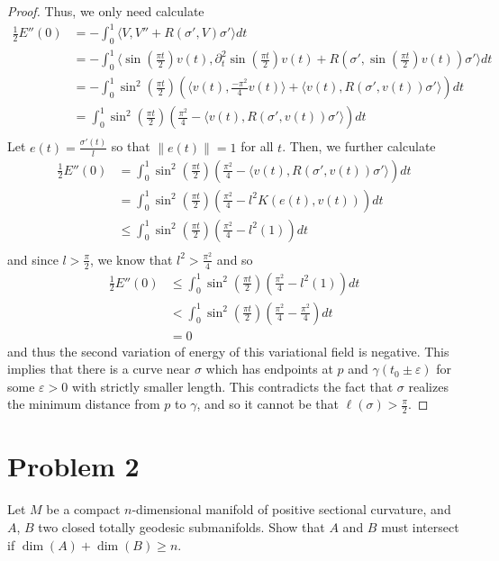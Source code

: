 \documentclass[fontsize=11pt]{scrartcl} %
\numberwithin{equation}{section} %
\numberwithin{figure}{section} %
\numberwithin{table}{section} %
\begin{document}
\begin{proof}
    Thus, we only need calculate
    \[
\begin{aligned}
    \frac{1}{2}E''(0) &= -\int_0^1\langle V,V'' + R(\sigma',V)\sigma'\rangle dt\\
    &=-\int_0^1\langle \sin(\frac{\pi t}{2})v(t),\partial_t^2\sin(\frac{\pi
    t}{2})v(t) + R(\sigma',\sin(\frac{\pi t}{2})v(t))\sigma'\rangle dt\\
    &= -\int_0^1 \sin^2(\frac{\pi t}{2})(\langle
    v(t),\frac{-\pi^2}{4}v(t)\rangle + \langle
v(t),R(\sigma',v(t))\sigma'\rangle)dt\\
    &= \int_0^1 \sin^2(\frac{\pi t}{2})(\frac{\pi^2}{4} - \langle
v(t),R(\sigma',v(t))\sigma'\rangle)dt\\
\end{aligned}
    \]
    Let $e(t) = \frac{\sigma'(t)}{l}$ so that $\|e(t)\|=1$ for all $t$. Then, we
    further calculate
    \[
\begin{aligned}
    \frac{1}{2}E''(0)
    &= \int_0^1 \sin^2(\frac{\pi t}{2})(\frac{\pi^2}{4} - \langle
v(t),R(\sigma',v(t))\sigma'\rangle)dt\\
&= \int_0^1 \sin^2(\frac{\pi t}{2})(\frac{\pi^2}{4} - l^2K(e(t),v(t)))dt\\
    &\leq
    \int_0^1 \sin^2(\frac{\pi t}{2})(\frac{\pi^2}{4} - l^2(1))dt\\
\end{aligned}
    \]
    and since $l > \frac{\pi}{2}$, we know that $l^2 > \frac{\pi^2}{4}$ and so
    \[
\begin{aligned}
    \frac{1}{2}E''(0)
    &\leq
    \int_0^1 \sin^2(\frac{\pi t}{2})(\frac{\pi^2}{4} - l^2(1))dt\\
    &<
    \int_0^1 \sin^2(\frac{\pi t}{2})(\frac{\pi^2}{4} - \frac{\pi^2}{4})dt\\
    &=0
\end{aligned}
    \]
    and thus the second variation of energy of this variational field is
    negative. This implies that there is a curve near $\sigma$ which has
    endpoints at $p$ and $\gamma(t_0\pm\varepsilon)$ for some $\varepsilon>0$
    with strictly smaller length. This contradicts the fact that $\sigma$
    realizes the minimum distance from $p$ to $\gamma$, and so it cannot be that
    $\ell(\sigma)>\frac{\pi}{2}$.
\end{proof}


\newpage

\section*{Problem 2}
Let $M$ be a compact $n$-dimensional manifold of positive sectional curvature,
and $A$, $B$ two closed totally geodesic submanifolds. Show that $A$ and $B$
must intersect if $\dim(A) + \dim(B)\geq n$.
\end{document}
